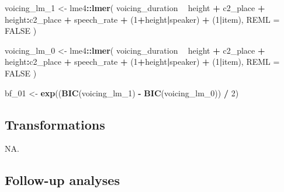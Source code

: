 \documentclass[11pt,]{article}
\newenvironment{Shaded}{\begin{snugshade}}{\end{snugshade}}
\newcommand{\DataTypeTok}[1]{\textcolor[rgb]{0.13,0.29,0.53}{#1}}
\newcommand{\DecValTok}[1]{\textcolor[rgb]{0.00,0.00,0.81}{#1}}
\newcommand{\KeywordTok}[1]{\textcolor[rgb]{0.13,0.29,0.53}{\textbf{#1}}}
\newcommand{\NormalTok}[1]{#1}
\newcommand{\OperatorTok}[1]{\textcolor[rgb]{0.81,0.36,0.00}{\textbf{#1}}}
\newcommand{\OtherTok}[1]{\textcolor[rgb]{0.56,0.35,0.01}{#1}}
\newcommand{\StringTok}[1]{\textcolor[rgb]{0.31,0.60,0.02}{#1}}
\begin{document}
\begin{Shaded}
\begin{Highlighting}[]
\NormalTok{voicing_lm_}\DecValTok{1}\NormalTok{ <-}\StringTok{ }\NormalTok{lme4}\OperatorTok{::}\KeywordTok{lmer}\NormalTok{(}
\NormalTok{  voicing_duration }\OperatorTok{~}
\StringTok{    }\NormalTok{height }\OperatorTok{+}
\StringTok{    }\NormalTok{c2_place }\OperatorTok{+}
\StringTok{    }\NormalTok{height}\OperatorTok{:}\NormalTok{c2_place }\OperatorTok{+}
\StringTok{    }\NormalTok{speech_rate }\OperatorTok{+}
\StringTok{    }\NormalTok{(}\DecValTok{1}\OperatorTok{+}\NormalTok{height}\OperatorTok{|}\NormalTok{speaker) }\OperatorTok{+}
\StringTok{    }\NormalTok{(}\DecValTok{1}\OperatorTok{|}\NormalTok{item),}
  \DataTypeTok{REML =} \OtherTok{FALSE}
\NormalTok{)}

\NormalTok{voicing_lm_}\DecValTok{0}\NormalTok{ <-}\StringTok{ }\NormalTok{lme4}\OperatorTok{::}\KeywordTok{lmer}\NormalTok{(}
\NormalTok{  voicing_duration }\OperatorTok{~}
\StringTok{    }\NormalTok{height }\OperatorTok{+}
\StringTok{    }\NormalTok{c2_place }\OperatorTok{+}
\StringTok{    }\NormalTok{height}\OperatorTok{:}\NormalTok{c2_place }\OperatorTok{+}
\StringTok{    }\NormalTok{speech_rate }\OperatorTok{+}
\StringTok{    }\NormalTok{(}\DecValTok{1}\OperatorTok{+}\NormalTok{height}\OperatorTok{|}\NormalTok{speaker) }\OperatorTok{+}
\StringTok{    }\NormalTok{(}\DecValTok{1}\OperatorTok{|}\NormalTok{item),}
  \DataTypeTok{REML =} \OtherTok{FALSE}
\NormalTok{)}

\NormalTok{bf_}\DecValTok{01}\NormalTok{ <-}\StringTok{ }\KeywordTok{exp}\NormalTok{((}\KeywordTok{BIC}\NormalTok{(voicing_lm_}\DecValTok{1}\NormalTok{) }\OperatorTok{-}\StringTok{ }\KeywordTok{BIC}\NormalTok{(voicing_lm_}\DecValTok{0}\NormalTok{)) }\OperatorTok{/}\StringTok{ }\DecValTok{2}\NormalTok{)}
\end{Highlighting}
\end{Shaded}

\hypertarget{transformations}{%
\subsection{Transformations}\label{transformations}}

NA.

\hypertarget{follow-up-analyses}{%
\subsection{Follow-up analyses}\label{follow-up-analyses}}
\end{document}
